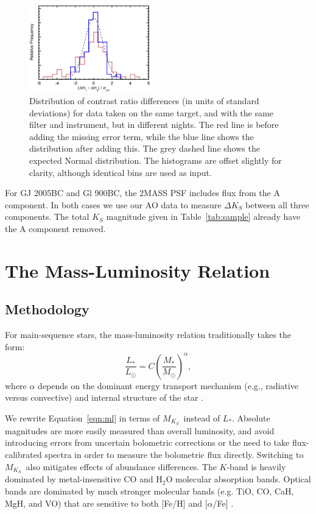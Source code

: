 \documentclass[twocolumn]{aastex62}
\newcommand{\mks}{$M_{K_S}$}
\begin{document}
\begin{figure}[t]
\begin{center}
\includegraphics[width=0.47\textwidth]{errors.eps}
\caption{Distribution of contrast ratio differences (in units of standard deviations) for data taken on the same target, and with the same filter and instrument, but in different nights. The red line is before adding the missing error term, while the blue line shows the distribution after adding this. The grey dashed line shows the expected Normal distribution. The histograms are offset slightly for clarity, although identical bins are used as input.}
\label{fig:magnitudes}
\end{center}
\end{figure}

For GJ 2005BC and Gl 900BC, the 2MASS PSF includes flux from the A component. In both cases we use our AO data to measure $\Delta K_S$ between all three components. The total $K_S$ magnitude given in Table~\ref{tab:sample} already have the A component removed. 

\section{The Mass-Luminosity Relation}\label{sec:relation}

\subsection{Methodology}\label{sec:methods}

For main-sequence stars, the mass-luminosity relation traditionally takes the form:
\begin{equation}\label{eqn:ml}
\frac{L_*}{L_\odot} = C \left(\frac{M_*}{M_\odot}\right)^\alpha,
\end{equation}
where $\alpha$ depends on the dominant energy transport mechanism (e.g., radiative versus convective) and internal structure of the star \citep{2004sipp.book.....H}.

We rewrite Equation~\ref{eqn:ml} in terms of \mks\ instead of $L_*$. Absolute magnitudes are more easily measured than overall luminosity, and avoid introducing errors from uncertain bolometric corrections or the need to take flux-calibrated spectra in order to measure the bolometric flux directly. Switching to \mks\ also mitigates effects of abundance differences. The $K$-band is heavily dominated by metal-insensitive CO and H$_2$O molecular absorption bands. Optical bands are dominated by much stronger molecular bands (e.g. TiO, CO, CaH, MgH, and VO) that are sensitive to both [Fe/H] and [$\alpha$/Fe] \citep[Figure~\ref{fig:metal}, also see][]{Woolf:2006uq,Lepine:2007fk,Mann2013a}. 
\end{document}
